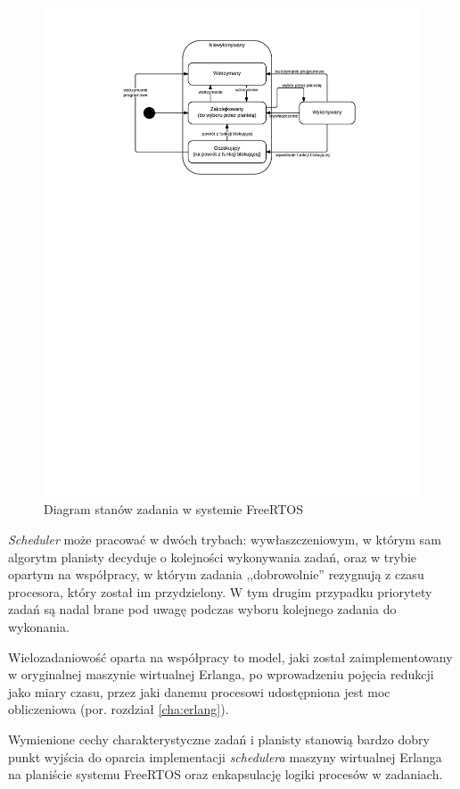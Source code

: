 \begin{figure}[h]
\centerline{\includegraphics[scale=1, clip, trim=0 180mm 0 15mm]{freertos_task_state}}
\caption{Diagram stanów zadania w systemie FreeRTOS}
\label{fig:taskstate}
\end{figure}


\emph{Scheduler} może pracować w dwóch trybach: wywłaszczeniowym, w którym sam algorytm planisty decyduje o kolejności wykonywania zadań, oraz w trybie opartym na współpracy, w którym zadania ,,dobrowolnie'' rezygnują z czasu procesora, który został im przydzielony. W tym drugim przypadku priorytety zadań są nadal brane pod uwagę podczas wyboru kolejnego zadania do wykonania.

Wielozadaniowość oparta na współpracy to model, jaki został zaimplementowany w oryginalnej maszynie wirtualnej Erlanga, po wprowadzeniu pojęcia redukcji jako miary czasu, przez jaki danemu procesowi udostępniona jest moc obliczeniowa (por. rozdział \ref{cha:erlang}).

Wymienione cechy charakterystyczne zadań i planisty stanowią bardzo dobry punkt wyjścia do oparcia implementacji \emph{schedulera} maszyny wirtualnej Erlanga na planiście systemu FreeRTOS oraz enkapsulację logiki procesów w zadaniach.

